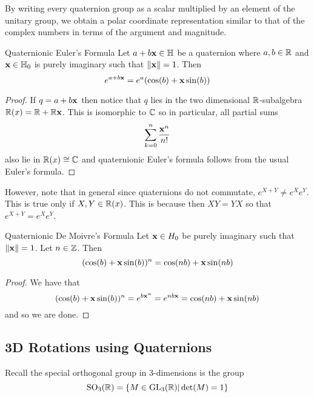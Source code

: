 \documentclass[a4paper]{article}
\begin{document}
By writing every quaternion group as a scalar multiplied by an element of the unitary group, we obtain a polar coordinate representation similar to that of the complex numbers in terms of the argument and magnitude. 

\begin{prp}{Quaternionic Euler's Formula}{} Let $a+b\vb{x}\in\mathbb{H}$ be a quaternion where $a,b\in\mathbb{R}$ and $\vb{x}\in\mathbb{H}_0$ is purely imaginary such that $\|\vb{x}\|=1$. Then $$e^{a+b\vb{x}}=e^a(\cos(b)+\vb{x}\sin(b))$$ \tcbline
\begin{proof}
If $q=a+b\vb{x}$ then notice that $q$ lies in the two dimensional $\mathbb{R}$-subalgebra $\mathbb{R}(x)=\mathbb{R}+\mathbb{R}\vb{x}$. This is isomorphic to $\mathbb{C}$ so in particular, all partial sums $$\sum_{k=0}^n\frac{\vb{x}^n}{n!}$$ also lie in $\mathbb{R}(x)\cong\mathbb{C}$ and quaternionic Euler's formula follows from the usual Euler's formula. 
\end{proof}
\end{prp}

However, note that in general since quaternions do not commutate, $e^{X+Y}\neq e^Xe^Y$. This is true only if $X,Y\in\mathbb{R}(x)$. This is because then $XY=YX$ so that $e^{X+Y}=e^Xe^Y$. 

\begin{prp}{Quaternionic De Moivre's Formula}{} Let $\vb{x}\in H_0$ be purely imaginary such that $\|\vb{x}\|=1$. Let $n\in\mathbb{Z}$. Then $$(\cos(b)+\vb{x}\sin(b))^n=\cos(nb)+\vb{x}\sin(nb)$$ \tcbline
\begin{proof}
We have that $$(\cos(b)+\vb{x}\sin(b))^n=e^{{b\vb{x}}^n}=e^{nb\vb{x}}=\cos(nb)+\vb{x}\sin(nb)$$ and so we are done. 
\end{proof}
\end{prp}

\subsection{3D Rotations using Quaternions}
Recall the special orthogonal group in $3$-dimensions is the group $$\text{SO}_3(\mathbb{R})=\{M\in\text{GL}_3(\mathbb{R})|\det(M)=1\}$$
\end{document}
